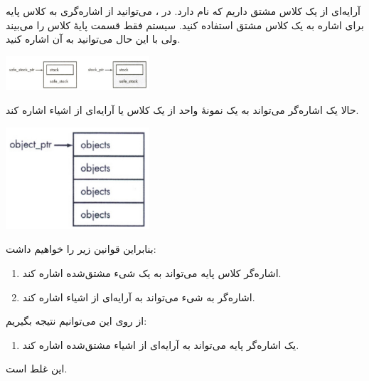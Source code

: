 \section{}
\paragraph{}\label{answer:72}
آرایه‌ای از یک کلاس مشتق داریم که  نام دارد. در ، می‌توانید از اشاره‌گری به کلاس پایه  برای اشاره به یک کلاس مشتق  استفاده کنید. سیستم فقط قسمت پایهٔ کلاس را می‌بیند ولی با این حال می‌توانید به آن اشاره کنید.
\begin{center}
    \includegraphics[keepaspectratio,width=0.4\textwidth,height=0.4\textheight]{images/image04.jpg}
\end{center}
حالا یک اشاره‌گر می‌تواند به یک نمونهٔ واحد از یک کلاس یا آرایه‌ای از اشیاء اشاره کند.
\begin{center}
    \includegraphics[keepaspectratio,width=0.4\textwidth,height=0.4\textheight]{images/image05.jpg}
\end{center}
بنابراین قوانین زیر را خواهیم داشت:
\begin{enumerate}
    \item اشاره‌گر کلاس پایه می‌تواند به یک شیء مشتق‌شده اشاره کند.
    \item اشاره‌گر به شیء می‌تواند به آرایه‌ای از اشیاء اشاره کند.
\end{enumerate}

از روی این می‌توانیم نتیجه بگیریم:
\begin{enumerate}
    \item یک اشاره‌گر پایه می‌تواند به آرایه‌ای از اشیاء مشتق‌شده اشاره کند.
\end{enumerate}

این غلط است.

